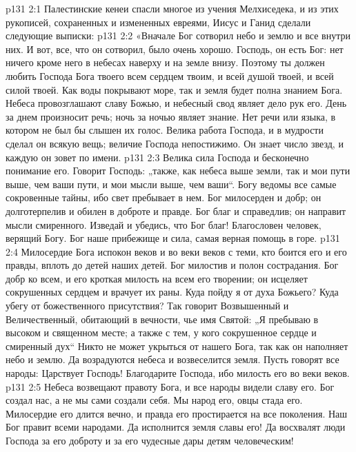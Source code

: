\vs p131 2:1 Палестинские кенеи спасли многое из учения Мелхиседека, и из этих рукописей, сохраненных и измененных евреями, Иисус и Ганид сделали следующие выписки:
\vs p131 2:2 \pc «Вначале Бог сотворил небо и землю и все внутри них. И вот, все, что он сотворил, было очень хорошо. Господь, он есть Бог: нет ничего кроме него в небесах наверху и на земле внизу. Поэтому ты должен любить Господа Бога твоего всем сердцем твоим, и всей душой твоей, и всей силой твоей. Как воды покрывают море, так и земля будет полна знанием Бога. Небеса провозглашают славу Божью, и небесный свод являет дело рук его. День за днем произносит речь; ночь за ночью являет знание. Нет речи или языка, в котором не был бы слышен их голос. Велика работа Господа, и в мудрости сделал он всякую вещь; величие Господа непостижимо. Он знает число звезд, и каждую он зовет по имени.
\vs p131 2:3 Велика сила Господа и бесконечно понимание его. Говорит Господь: „также, как небеса выше земли, так и мои пути выше, чем ваши пути, и мои мысли выше, чем ваши“. Богу ведомы все самые сокровенные тайны, ибо свет пребывает в нем. Бог милосерден и добр; он долготерпелив и обилен в доброте и правде. Бог благ и справедлив; он направит мысли смиренного. Изведай и убедись, что Бог благ! Благословен человек, верящий Богу. Бог наше прибежище и сила, самая верная помощь в горе.
\vs p131 2:4 Милосердие Бога испокон веков и во веки веков с теми, кто боится его и его правды, вплоть до детей наших детей. Бог милостив и полон сострадания. Бог добр ко всем, и его кроткая милость на всем его творении; он исцеляет сокрушенных сердцем и врачует их раны. Куда пойду я от духа Божьего? Куда убегу от божественного присутствия? Так говорит Возвышенный и Величественный, обитающий в вечности, чье имя Святой: „Я пребываю в высоком и священном месте; а также с тем, у кого сокрушенное сердце и смиренный дух“ Никто не может укрыться от нашего Бога, так как он наполняет небо и землю. Да возрадуются небеса и возвеселится земля. Пусть говорят все народы: Царствует Господь! Благодарите Господа, ибо милость его во веки веков.
\vs p131 2:5 Небеса возвещают правоту Бога, и все народы видели славу его. Бог создал нас, а не мы сами создали себя. Мы народ его, овцы стада его. Милосердие его длится вечно, и правда его простирается на все поколения. Наш Бог правит всеми народами. Да исполнится земля славы его! Да восхвалят люди Господа за его доброту и за его чудесные дары детям человеческим!
